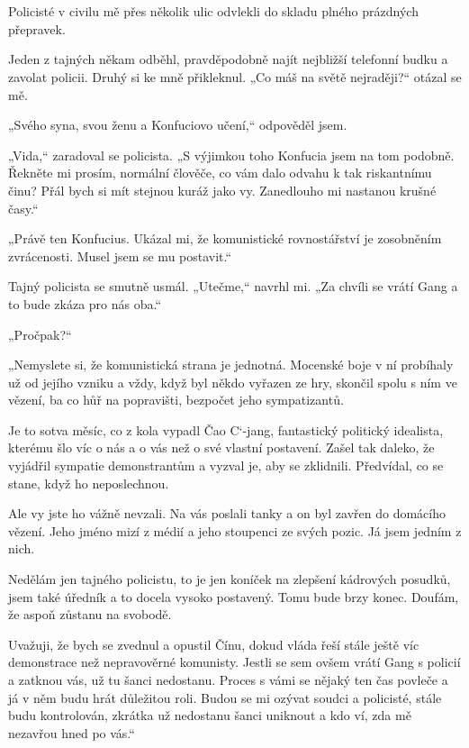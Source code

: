 \chapter{}

Policisté v civilu mě přes několik ulic odvlekli do skladu plného prázdných přepravek.

Jeden z tajných někam odběhl, pravděpodobně najít nejbližší telefonní budku a zavolat policii. Druhý si ke mně přikleknul.
„Co máš na světě nejraději?“ otázal se mě.

„Svého syna, svou ženu a Konfuciovo učení,“ odpověděl jsem.

„Vida,“ zaradoval se policista. „S výjimkou toho Konfucia jsem na tom podobně. Řekněte mi prosím, normální člověče, co vám dalo odvahu k tak riskantnímu činu? Přál bych si mít stejnou kuráž jako vy. Zanedlouho mi nastanou krušné časy.“

„Právě ten Konfucius. Ukázal mi, že komunistické rovnostářství je zosobněním zvrácenosti. Musel jsem se mu postavit.“

Tajný policista se smutně usmál. „Utečme,“ navrhl mi. „Za chvíli se vrátí Gang a to bude zkáza pro nás oba.“ 

„Pročpak?“

„Nemyslete si, že komunistická strana je jednotná. Mocenské boje v ní probíhaly už od jejího vzniku a vždy, když byl někdo vyřazen ze hry, skončil spolu s ním ve vězení, ba co hůř na popravišti, bezpočet jeho sympatizantů. 

Je to sotva měsíc, co z kola vypadl  Čao C‘-jang, fantastický politický idealista, kterému šlo víc o nás a o vás než o své vlastní postavení. Zašel tak daleko, že vyjádřil sympatie demonstrantům a vyzval je, aby se zklidnili. Předvídal, co se stane, když ho neposlechnou. 

Ale vy jste ho vážně nevzali. Na vás poslali tanky a on byl zavřen do domácího vězení. Jeho jméno mizí z médií a jeho stoupenci ze svých pozic. Já jsem jedním z nich. 

Nedělám jen tajného policistu, to je jen koníček na zlepšení kádrových posudků, jsem také úředník a to docela vysoko postavený. Tomu bude brzy konec. Doufám, že aspoň zůstanu na svobodě.

Uvažuji, že bych se zvednul a opustil Čínu, dokud vláda řeší stále ještě víc demonstrace než nepravověrné komunisty. Jestli se sem ovšem vrátí Gang s policií a zatknou vás, už tu šanci nedostanu. Proces s vámi se nějaký ten čas povleče a já v něm budu hrát důležitou roli. Budou se mi ozývat soudci a policisté, stále budu kontrolován, zkrátka už nedostanu šanci uniknout a kdo ví, zda mě nezavřou hned po vás.“

